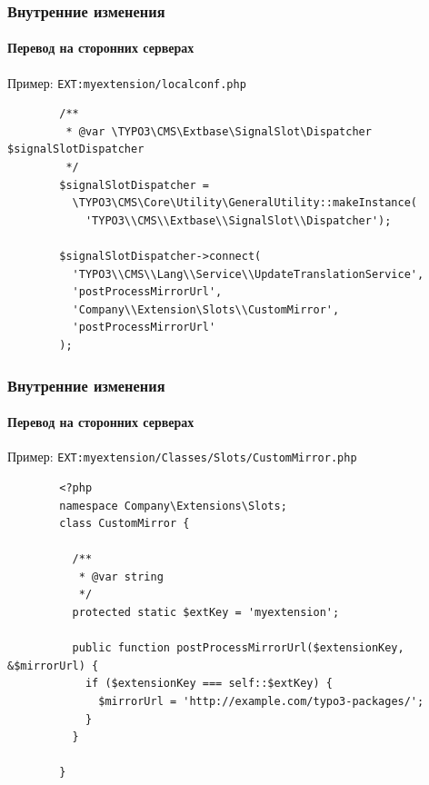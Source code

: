 
\begin{frame}[fragile]
	\frametitle{Внутренние изменения}
	\framesubtitle{Перевод на сторонних серверах}

	Пример: \texttt{EXT:myextension/localconf.php}

	\lstset{
		basicstyle=\tiny\ttfamily
	}

	\begin{lstlisting}
		/**
		 * @var \TYPO3\CMS\Extbase\SignalSlot\Dispatcher $signalSlotDispatcher
		 */
		$signalSlotDispatcher =
		  \TYPO3\CMS\Core\Utility\GeneralUtility::makeInstance(
		    'TYPO3\\CMS\\Extbase\\SignalSlot\\Dispatcher');

		$signalSlotDispatcher->connect(
		  'TYPO3\\CMS\\Lang\\Service\\UpdateTranslationService',
		  'postProcessMirrorUrl',
		  'Company\\Extension\Slots\\CustomMirror',
		  'postProcessMirrorUrl'
		);
	\end{lstlisting}

\end{frame}


\begin{frame}[fragile]
	\frametitle{Внутренние изменения}
	\framesubtitle{Перевод на сторонних серверах}

	Пример: \texttt{EXT:myextension/Classes/Slots/CustomMirror.php}

	\lstset{
		basicstyle=\tiny\ttfamily
	}

	\begin{lstlisting}
		<?php
		namespace Company\Extensions\Slots;
		class CustomMirror {

		  /**
		   * @var string
		   */
		  protected static $extKey = 'myextension';

		  public function postProcessMirrorUrl($extensionKey, &$mirrorUrl) {
		    if ($extensionKey === self::$extKey) {
		      $mirrorUrl = 'http://example.com/typo3-packages/';
		    }
		  }

		}
	\end{lstlisting}

\end{frame}

